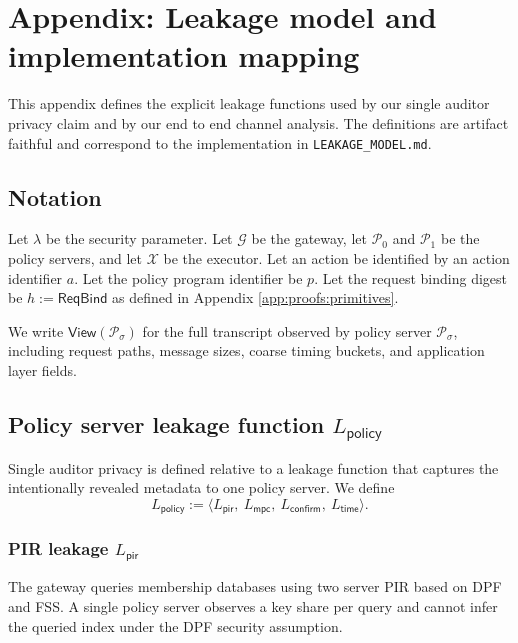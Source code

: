 
\section{Appendix: Leakage model and implementation mapping}
\label{app:leakage}

This appendix defines the explicit leakage functions used by our single auditor privacy claim and by our end to end channel analysis.
The definitions are artifact faithful and correspond to the implementation in \texttt{LEAKAGE\_MODEL.md}.

\subsection{Notation}

Let $\lambda$ be the security parameter.
Let $\mathcal{G}$ be the gateway, let $\mathcal{P}_0$ and $\mathcal{P}_1$ be the policy servers, and let $\mathcal{X}$ be the executor.
Let an action be identified by an action identifier $a$.
Let the policy program identifier be $p$.
Let the request binding digest be $h := \mathsf{ReqBind}$ as defined in Appendix \ref{app:proofs:primitives}.

We write $\mathsf{View}(\mathcal{P}_\sigma)$ for the full transcript observed by policy server $\mathcal{P}_\sigma$, including request paths, message sizes, coarse timing buckets, and application layer fields.

\subsection{Policy server leakage function $L_{\mathsf{policy}}$}

Single auditor privacy is defined relative to a leakage function that captures the intentionally revealed metadata to one policy server.
We define
\[
L_{\mathsf{policy}} := \langle L_{\mathsf{pir}},\ L_{\mathsf{mpc}},\ L_{\mathsf{confirm}},\ L_{\mathsf{time}} \rangle .
\]

\subsubsection{PIR leakage $L_{\mathsf{pir}}$}

The gateway queries membership databases using two server PIR based on DPF and FSS.
A single policy server observes a key share per query and cannot infer the queried index under the DPF security assumption.

